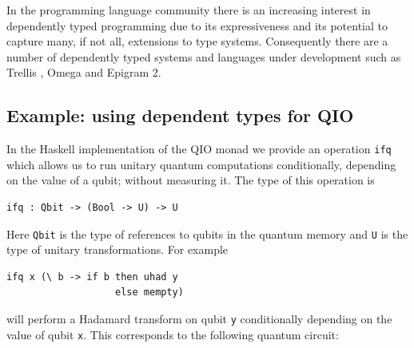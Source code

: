 \documentclass[a4paper]{article}
\begin{document}
In the programming language community there is an increasing interest
in dependently typed programming due to its expressiveness and its
potential to capture many, if not all, extensions to type
systems. Consequently there are a number of dependently typed systems
and languages under development such as Trellis , Omega
 and Epigram 2.



\subsection*{Example: using dependent types for QIO}
\label{sec:dependent-types-qio}

In the Haskell implementation of the QIO monad we provide an operation
\texttt{ifq} which allows us to run unitary quantum computations
conditionally, depending on the value of a qubit; without measuring it. 
The type of this operation is 
\begin{verbatim}
ifq : Qbit -> (Bool -> U) -> U  
\end{verbatim}
Here \texttt{Qbit} is the type of references to qubits in the quantum
memory and \texttt{U} is the type of unitary transformations. For
example
\begin{verbatim}
ifq x (\ b -> if b then uhad y 
                   else mempty)  
\end{verbatim}
will perform a Hadamard transform on qubit \texttt{y} conditionally 
depending on the value of qubit \texttt{x}. 
This corresponds to the following quantum circuit:
\end{document}
